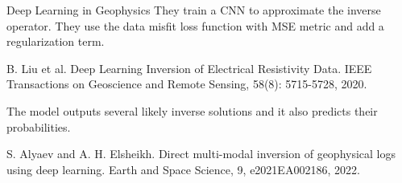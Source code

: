 \begin{frame}[t]{Deep Learning in Geophysics}
They train a CNN to approximate the inverse operator. They use the data misfit loss function with MSE metric and add a regularization term.
\begin{thebibliography}{5}
 \small{B. Liu et al. Deep Learning Inversion of Electrical Resistivity Data. IEEE Transactions on Geoscience and Remote Sensing, 58(8): 5715-5728, 2020.}
\end{thebibliography}
\vspace{0.2cm}

The model outputs several likely inverse solutions and it also predicts their probabilities. 
\begin{thebibliography}{5}
 \small{ S. Alyaev and A. H. Elsheikh. Direct multi-modal inversion of geophysical logs using deep learning. Earth and Space Science, 9, e2021EA002186, 2022.}
\end{thebibliography}
\vspace{0.2cm}


\end{frame}